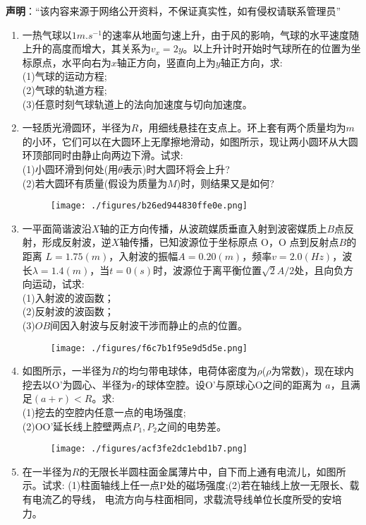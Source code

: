 

\textbf{声明}：“该内容来源于网络公开资料，不保证真实性，如有侵权请联系管理员”

\begin{enumerate}
\item 一热气球以$1m.s^{-1}$的速率从地面匀速上升，由于风的影响，气球的水平速度随上升的高度而增大，其关系为$v_x=2y$。以上升计时开始时气球所在的位置为坐标原点，水平向右为$x$轴正方向，竖直向上为$y$轴正方向，求:\\
(1)气球的运动方程;\\
(2)气球的轨道方程;\\
(3)任意时刻气球轨道上的法向加速度与切向加速度。
\item 一轻质光滑圆环，半径为$R$，用细线悬挂在支点上。环上套有两个质量均为$m$的小环，它们可以在大圆环上无摩擦地滑动，如图所示，现让两小圆环从大圆环顶部同时由静止向两边下滑。试求:\\
(1)小圆环滑到何处(用$\theta$表示)时大圆环将会上升?\\
(2)若大圆环有质量(假设为质量为$M$)时，则结果又是如何?
\begin{figure}[ht]
\centering
\texttt{[image: ./figures/b26ed944830ffe0e.png]}
\caption{} \label{fig_XD12_1}
\end{figure}
\item 一平面简谐波沿$X$轴的正方向传播，从波疏媒质垂直入射到波密媒质上$B$点反射，形成反射波，逆$X$轴传播，已知波源位于坐标原点 O，O 点到反射点$B$的距离 $L=1.75(m)$，入射波的振幅$A=0.20(m)$，频率$v=2.0(Hz)$，波长$\lambda=1.4(m)$，当$t=0(s)$时，波源位于离平衡位置$\sqrt{2}A/2$处，且向负方向运动，试求:\\
(1)入射波的波函数；\\
(2)反射波的波函数；\\
(3)$OB$间因入射波与反射波干涉而静止的点的位置。
\begin{figure}[ht]
\centering
\texttt{[image: ./figures/f6c7b1f95e9d5d5e.png]}
\caption{} \label{fig_XD12_2}
\end{figure}
\item 如图所示，一半径为$R$的均匀带电球体，电荷体密度为$\rho$($\rho$为常数)，现在球内挖去以O'为圆心、半径为$r$的球体空腔。设O'与原球心O之间的距离为 $a$，且满足$(a+r)<R$。求:\\
(1)挖去的空腔内任意一点的电场强度;\\
(2)OO'延长线上腔壁两点$P_1,P_2$之间的电势差。
\begin{figure}[ht]
\centering
\texttt{[image: ./figures/acf3fe2dc1ebd1b7.png]}
\caption{} \label{fig_XD12_3}
\end{figure}
\item 在一半径为$R$的无限长半圆柱面金属薄片中，自下而上通有电流儿，如图所示。试求:
(1)柱面轴线上任一点P处的磁场强度;(2)若在轴线上放一无限长、载有电流乙的导线，
电流方向与柱面相同，求载流导线单位长度所受的安培力。
\end{enumerate}